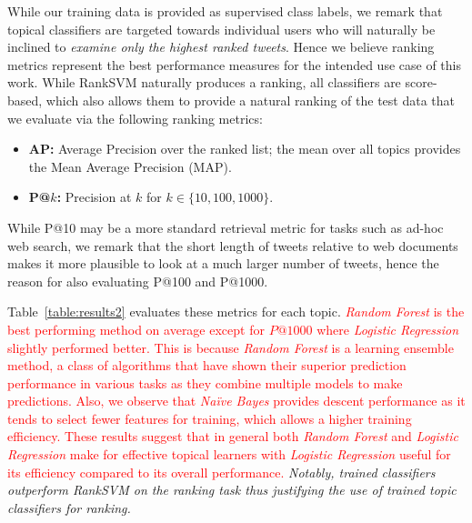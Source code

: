 While our training data
is provided as supervised class labels, we remark that topical classifiers
are targeted towards individual users who will naturally be inclined 
to \emph{examine only the highest ranked tweets}.  Hence we believe ranking
metrics represent the best performance measures for the intended use case of this work.
While RankSVM naturally produces a ranking, all classifiers are score-based, which also allows
them to provide a natural ranking of the test data that we evaluate via the following
ranking metrics:
\begin{itemize}
\item {\bf AP:} Average Precision over the ranked list; the mean over
all topics provides the Mean Average Precision (MAP).
\item {\bf P@$k$:} Precision at $k$ for $k \in \{ 10, 100, 1000 \}$.
\end{itemize}
While P@10 may be a more standard retrieval metric for tasks such
as ad-hoc web search, we remark that the short length of tweets relative
to web documents makes it more plausible to look at a much larger number
of tweets, hence the reason for also evaluating P@100 and P@1000.


Table~\ref{table:results2} evaluates these metrics for each topic.
\textcolor{red}{\textit{Random Forest} is the best performing method on average except for $P@1000$ where \textit{Logistic Regression} slightly performed better. This is because \textit{Random Forest} is a learning ensemble method, a class of algorithms that have shown their superior prediction performance in various tasks as they combine multiple models to make predictions.
Also, we observe that \textit{Na\"{i}ve Bayes} provides descent performance as it tends to select fewer features for training, which allows a higher training efficiency.
These results suggest that in general both \textit{Random Forest} and \textit{Logistic Regression}
 make for effective topical 
learners with \textit{Logistic Regression} useful for 
its efficiency compared to its overall performance.}  \emph{Notably,
trained classifiers outperform RankSVM on the ranking task thus justifying the use of trained topic classifiers for ranking.}


